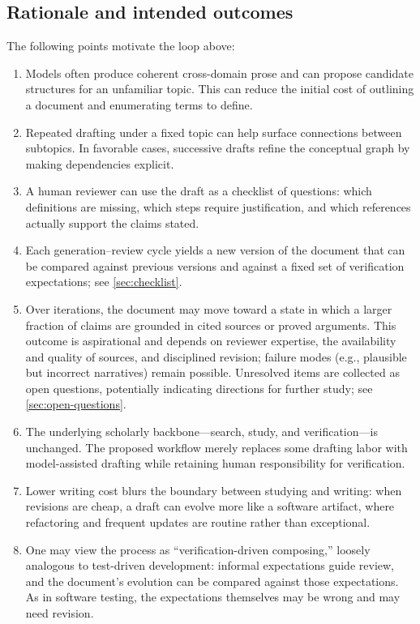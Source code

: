 \documentclass[11pt,a4paper]{article}
\theoremstyle{definition}
\theoremstyle{remark}
\begin{document}
\subsection{Rationale and intended outcomes}
\label{sec:rationale}

The following points motivate the loop above:

\begin{enumerate}
  \item Models often produce coherent cross-domain prose and can propose candidate structures for an unfamiliar topic. This can reduce the initial cost of outlining a document and enumerating terms to define.

  \item Repeated drafting under a fixed topic can help surface connections between subtopics. In favorable cases, successive drafts refine the conceptual graph by making dependencies explicit.

  \item A human reviewer can use the draft as a checklist of questions: which definitions are missing, which steps require justification, and which references actually support the claims stated.

  \item Each generation--review cycle yields a new version of the document that can be compared against previous versions and against a fixed set of verification expectations; see \cref{sec:checklist}.

  \item Over iterations, the document may move toward a state in which a larger fraction of claims are grounded in cited sources or proved arguments. This outcome is aspirational and depends on reviewer expertise, the availability and quality of sources, and disciplined revision; failure modes (e.g., plausible but incorrect narratives) remain possible. Unresolved items are collected as open questions, potentially indicating directions for further study; see \cref{sec:open-questions}.

  \item The underlying scholarly backbone---search, study, and verification---is unchanged. The proposed workflow merely replaces some drafting labor with model-assisted drafting while retaining human responsibility for verification.

  \item Lower writing cost blurs the boundary between studying and writing: when revisions are cheap, a draft can evolve more like a software artifact, where refactoring and frequent updates are routine rather than exceptional.

  \item One may view the process as ``verification-driven composing,'' loosely analogous to test-driven development: informal expectations guide review, and the document’s evolution can be compared against those expectations. As in software testing, the expectations themselves may be wrong and may need revision.
\end{enumerate}
\end{document}

